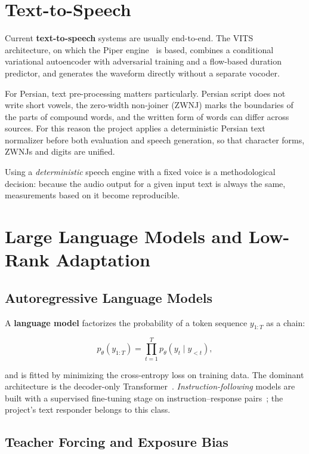\section{Text-to-Speech}
\label{sec:tts}

Current \textbf{text-to-speech} systems are usually end-to-end. The
VITS~\cite{kim2021vits} architecture, on which the Piper engine~\cite{piper2023} is
based, combines a conditional variational autoencoder with adversarial training and
a flow-based duration predictor, and generates the waveform directly without a
separate vocoder.

For Persian, text pre-processing matters particularly. Persian script does not
write short vowels, the zero-width non-joiner (ZWNJ) marks the boundaries of the
parts of compound words, and the written form of words can differ across sources.
For this reason the project applies a deterministic Persian text normalizer before
both evaluation and speech generation, so that character forms, ZWNJs and digits
are unified.

Using a \emph{deterministic} speech engine with a fixed voice is a methodological
decision: because the audio output for a given input text is always the same,
measurements based on it become reproducible.

\section{Large Language Models and Low-Rank Adaptation}
\label{sec:llm}

\subsection{Autoregressive Language Models}

A \textbf{language model} factorizes the probability of a token sequence
$y_{1:T}$ as a chain:

\begin{equation}
p_\theta(y_{1:T}) = \prod_{t=1}^{T} p_\theta(y_t \mid y_{<t}),
\label{eq:lm}
\end{equation}

and is fitted by minimizing the cross-entropy loss on training data. The dominant
architecture is the decoder-only Transformer~\cite{vaswani2017attention}.
\emph{Instruction-following} models are built with a supervised fine-tuning stage on
instruction--response pairs~\cite{ouyang2022instructgpt}; the project's text
responder belongs to this class.

\subsection{Teacher Forcing and Exposure Bias}
\label{sec:exposure-bias}

